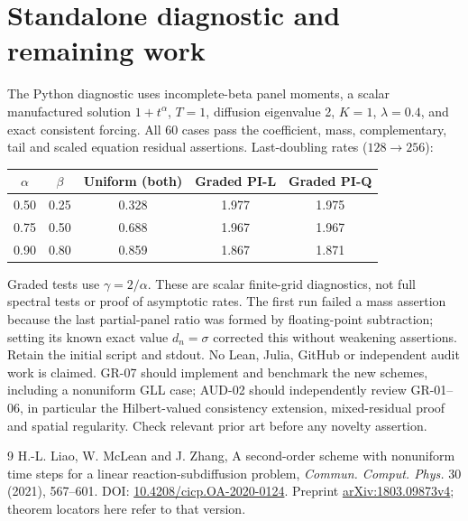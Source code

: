 \documentclass[11pt,a4paper]{article}
\begin{document}
\section{Standalone diagnostic and remaining work}
The Python diagnostic uses incomplete-beta panel moments, a scalar manufactured solution $1+t^\alpha$, $T=1$, diffusion eigenvalue 2, $K=1$, $\lambda=0.4$, and exact consistent forcing. All 60 cases pass the coefficient, mass, complementary, tail and scaled equation residual assertions. Last-doubling rates ($128\to256$):
\begin{center}
\begin{tabular}{ccccc}\toprule
$\alpha$&$\beta$&Uniform (both)&Graded PI-L&Graded PI-Q\\\midrule
0.50&0.25&0.328&1.977&1.975\\
0.75&0.50&0.688&1.967&1.967\\
0.90&0.80&0.859&1.867&1.871\\\bottomrule
\end{tabular}
\end{center}
Graded tests use $\gamma=2/\alpha$. These are scalar finite-grid diagnostics, not full spectral tests or proof of asymptotic rates. The first run failed a mass assertion because the last partial-panel ratio was formed by floating-point subtraction; setting its known exact value $d_n=\sigma$ corrected this without weakening assertions. Retain the initial script and stdout. No Lean, Julia, GitHub or independent audit work is claimed. GR-07 should implement and benchmark the new schemes, including a nonuniform GLL case; AUD-02 should independently review GR-01--06, in particular the Hilbert-valued consistency extension, mixed-residual proof and spatial regularity. Check relevant prior art before any novelty assertion.
\begin{thebibliography}{9}
 H.-L. Liao, W. McLean and J. Zhang, A second-order scheme with nonuniform time steps for a linear reaction-subdiffusion problem, \emph{Commun. Comput. Phys.} 30 (2021), 567--601. DOI: \href{https://doi.org/10.4208/cicp.OA-2020-0124}{10.4208/cicp.OA-2020-0124}. Preprint \href{https://arxiv.org/abs/1803.09873v4}{arXiv:1803.09873v4}; theorem locators here refer to that version.
\end{thebibliography}
\end{document}
